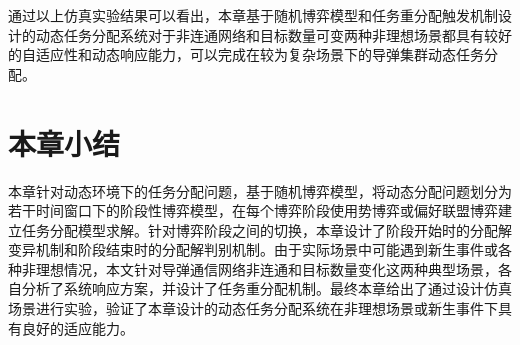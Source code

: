 通过以上仿真实验结果可以看出，本章基于随机博弈模型和任务重分配触发机制设计的动态任务分配系统对于非连通网络和目标数量可变两种非理想场景都具有较好的自适应性和动态响应能力，可以完成在较为复杂场景下的导弹集群动态任务分配。

\section{本章小结}
\label{reassign:sec:conclusion}

本章针对动态环境下的任务分配问题，基于随机博弈模型，将动态分配问题划分为若干时间窗口下的阶段性博弈模型，在每个博弈阶段使用势博弈或偏好联盟博弈建立任务分配模型求解。针对博弈阶段之间的切换，本章设计了阶段开始时的分配解变异机制和阶段结束时的分配解判别机制。由于实际场景中可能遇到新生事件或各种非理想情况，本文针对导弹通信网络非连通和目标数量变化这两种典型场景，各自分析了系统响应方案，并设计了任务重分配机制。最终本章给出了通过设计仿真场景进行实验，验证了本章设计的动态任务分配系统在非理想场景或新生事件下具有良好的适应能力。

